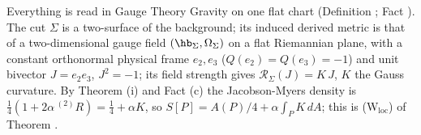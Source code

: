 Everything is read in Gauge Theory Gravity on one flat chart (Definition ; Fact ). The cut $\Sigma$ is a two-surface of the background; its induced derived metric is that of a two-dimensional gauge field $(\hb_{\Sigma}, \Omega_{\Sigma})$ on a flat Riemannian plane, with a constant orthonormal physical frame $e_{2}, e_{3}$ ($Q(e_{2}) = Q(e_{3}) = -1$) and unit bivector $J = e_{2}e_{3}$, $J^{2} = -1$; its field strength gives $\mathcal{R}_{\Sigma}(J) = K\,J$, $K$ the Gauss curvature. By Theorem (i) and Fact (c) the Jacobson-Myers density is $\tfrac14(1 + 2\alpha\,{}^{(2)}\!R) = \tfrac14 + \alpha K$, so $S[P] = A(P)/4 + \alpha\int_{P}K\,dA$; this is (W$_{\mathrm{loc}}$) of Theorem .

